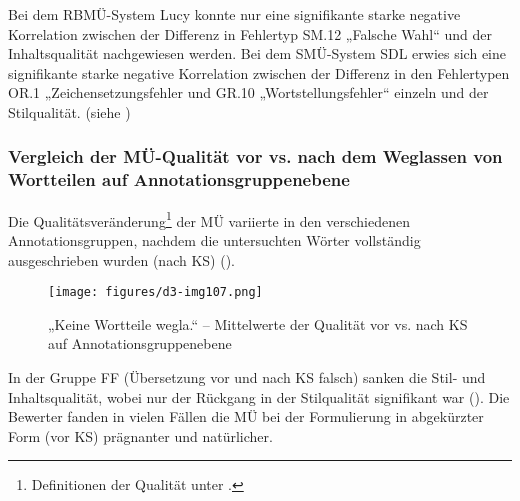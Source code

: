 Bei dem RBMÜ-System Lucy konnte nur eine signifikante starke negative Korrelation zwischen der Differenz in Fehlertyp SM.12 „Falsche Wahl“ und der Inhaltsqualität nachgewiesen werden. Bei dem SMÜ-System SDL erwies sich eine signifikante starke negative Korrelation zwischen der Differenz in den Fehlertypen OR.1 „Zeichensetzungsfehler und GR.10 „Wortstellungsfehler“ einzeln und der Stilqualität. (siehe )

\subsubsection{\label{sec:5.3.9.5}Vergleich der MÜ-Qualität vor vs. nach dem Weglassen von Wortteilen auf Annotationsgruppenebene}

Die Qualitätsveränderung\footnote{\textrm{Definitionen der Qualität unter .}} der MÜ variierte in den verschiedenen Annotationsgruppen, nachdem die untersuchten Wörter vollständig ausgeschrieben wurden (nach KS) ().


\begin{figure}
\texttt{[image: figures/d3-img107.png]}

\caption{\label{fig:05:135}„Keine Wortteile wegla.“ -- Mittelwerte der Qualität vor vs. nach KS auf Annotationsgruppenebene   }
\end{figure}

In der Gruppe FF (Übersetzung vor und nach KS falsch) sanken die Stil- und Inhaltsqualität, wobei nur der Rückgang in der Stilqualität signifikant war (). Die Bewerter fanden in vielen Fällen die MÜ bei der Formulierung in abgekürzter Form (vor KS) prägnanter und natürlicher.


